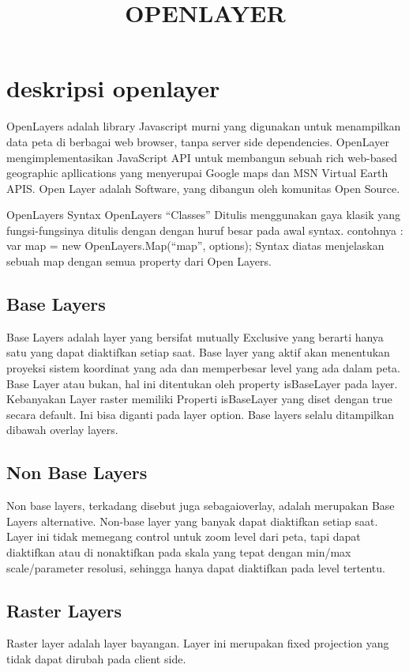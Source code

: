 \documentclass{article}
\title{OPENLAYER}
\begin{document}
\maketitle

\section{deskripsi openlayer}
  OpenLayers adalah library Javascript murni yang digunakan untuk menampilkan data peta di berbagai web browser, tanpa server side dependencies.
  OpenLayer mengimplementasikan JavaScript API untuk membangun sebuah rich web-based geographic apllications yang menyerupai Google maps dan MSN Virtual Earth APIS.
  Open Layer adalah Software, yang dibangun oleh komunitas Open Source.
  
  OpenLayers Syntax
  OpenLayers “Classes”
  Ditulis menggunakan gaya klasik yang fungsi-fungsinya ditulis dengan dengan huruf besar pada awal syntax.
  contohnya : var map = new OpenLayers.Map(“map”, options);
  Syntax diatas menjelaskan sebuah map dengan semua property dari Open Layers. 
  
\subsection{Base Layers}
 Base Layers adalah layer yang bersifat mutually Exclusive yang berarti hanya satu yang dapat diaktifkan setiap saat.
 Base layer yang aktif akan menentukan proyeksi sistem koordinat yang ada dan memperbesar level yang ada dalam peta. 
 Base Layer atau bukan, hal ini ditentukan oleh property isBaseLayer pada layer. Kebanyakan Layer raster memiliki Properti isBaseLayer yang diset dengan true secara default. 
 Ini bisa diganti pada layer option. Base layers selalu ditampilkan dibawah overlay layers.

\subsection{Non Base Layers}
Non base layers, terkadang disebut juga sebagaioverlay, adalah merupakan Base Layers alternative. Non-base layer yang banyak dapat diaktifkan setiap saat.
Layer ini tidak memegang control untuk zoom level dari peta, tapi dapat diaktifkan atau di nonaktifkan pada skala yang tepat dengan min/max scale/parameter resolusi, sehingga hanya dapat diaktifkan pada level tertentu.

\subsection {Raster Layers}
Raster layer adalah layer bayangan. Layer ini merupakan fixed projection yang tidak dapat dirubah pada client side.
\end{document}

